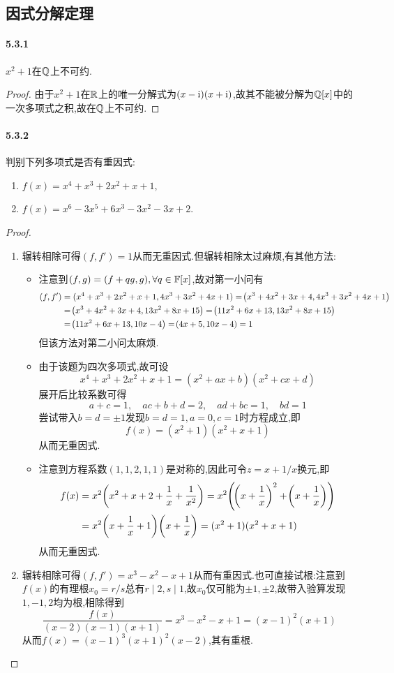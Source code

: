 \documentclass[11pt]{article}
\begin{document}
\subsection{因式分解定理}
\paragraph{5.3.1}$x^2+1$在$\mathbb{Q}$上不可约.
\begin{proof}
    由于$x^2+1$在$\mathbb{R}$上的唯一分解式为$(x-\mathrm{i})(x+\mathrm{i})$,故其不能被分解为$\mathbb{Q}[x]$中的一次多项式之积,故在$\mathbb{Q}$上不可约.
\end{proof}
\paragraph{5.3.2}判别下列多项式是否有重因式:
\begin{enumerate}
    \item $f(x)=x^4+x^3+2x^2+x+1$,
    \item $f(x)=x^6-3x^5+6x^3-3x^2-3x+2$.
\end{enumerate}
\begin{proof}
    \begin{enumerate}
        \item 辗转相除可得$(f,f')=1$从而无重因式.但辗转相除太过麻烦,有其他方法:
        \begin{itemize}
            \item 注意到$(f,g)=(f+qg,g), \forall q\in \mathbb{F}[x]$,故对第一小问有
        $$\begin{aligned}
            (f,f')&=(x^4+x^3+2x^2+x+1,4x^3+3x^2+4x+1)=\!\left(x^3+4x^2+3x+4,4x^3+3x^2+4x+1\right)\\
            &=\!\left(x^3+4x^2+3x+4,13x^2+8x+15\right)=\!\left(11x^2+6x+13,13x^2+8x+15\right)\\
            &=\!\left(11x^2+6x+13,10x-4\right)=\!\left(4 x + 5,10x-4\right)=1
        \end{aligned}$$
        但该方法对第二小问太麻烦.
        \item 由于该题为四次多项式,故可设
        $$x^4+x^3+2x^2+x+1=(x^2+ax+b)(x^2+cx+d)$$
        展开后比较系数可得
        $$a+c=1,\quad ac+b+d=2,\quad ad+bc=1,\quad bd=1$$
        尝试带入$b=d=\pm 1$发现$b=d=1, a=0,c=1$时方程成立,即
        $$f(x)=(x^2+1)(x^2+x+1)$$
        从而无重因式.
        \item 注意到方程系数$(1,1,2,1,1)$是对称的,因此可令$z=x+1/x$换元,即
        $$\begin{aligned}
            f(x)&=x^2\!\left(x^2+x+2+\frac{1}{x}+\frac{1}{x^2}\right)=x^2\!\left(\!\left(x+\frac{1}{x}\right)^2+\!\left(x+\frac{1}{x}\right)\right)\\
            &=x^2\!\left(x+\frac{1}{x}+1\right)\!\left(x+\frac{1}{x}\right)=(x^2+1)(x^2+x+1)\\
        \end{aligned}$$
        从而无重因式.
        \end{itemize}
        \item 辗转相除可得$(f,f')=x^3- x^2- x+1$从而有重因式.也可直接试根:注意到$f(x)$的有理根$x_0=r/s$总有$r\mid 2, s\mid 1$,故$x_0$仅可能为$\pm 1, \pm 2$,故带入验算发现$1,-1,2$均为根,相除得到
        $$\frac{f(x)}{(x-2)(x-1)(x+1)}=x^3-x^2-x+1=(x-1)^2 (x+1)$$
        从而$f(x)=(x-1)^3(x+1)^2(x-2)$,其有重根.
    \end{enumerate}
\end{proof}
\end{document}
